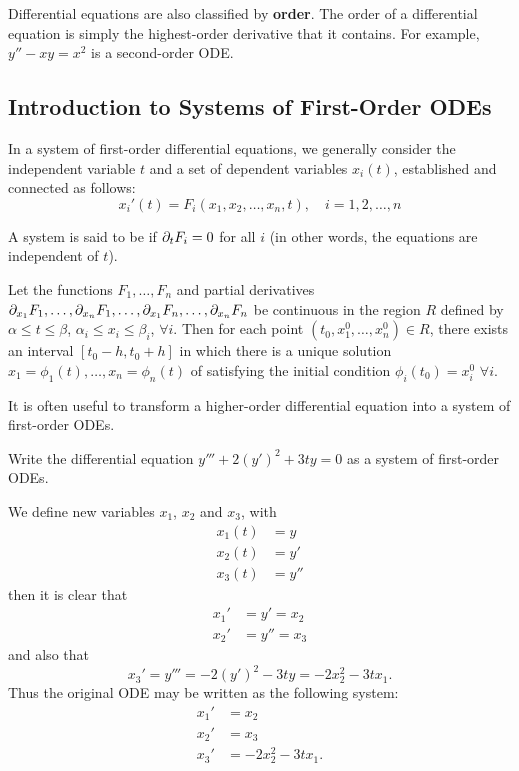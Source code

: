 Differential equations are also classified by \textbf{order}. The order of a differential equation is simply the highest-order derivative that it contains. For example, $y'' - xy = x^2$ is a second-order ODE.


\subsection{Introduction to Systems of First-Order ODEs}

In a system of first-order differential equations, we generally consider the independent variable $t$ and a set of dependent variables $x_i(t)$, established and connected as follows:
\begin{equation}\label{eq:fosystem}
	x_i'(t) = F_i(x_1, x_2, \ldots, x_n, t), \quad i = 1, 2, \ldots, n
\end{equation}

A system is said to be  if $\partial_t F_i = 0$ for all $i$ (in other words, the equations are independent of $t$).

\begin{theorem}
	Let the functions $F_1, \ldots, F_n$ and partial derivatives $\partial_{x_1}F_1, \ldots, \partial_{x_n}F_1, \ldots, \partial_{x_1}F_n, \ldots, \partial_{x_n}F_n$ be continuous in the region $R$ defined by $\alpha \leq t \leq \beta$, $\alpha_i \leq x_i \leq \beta_i$, $\forall i$. Then for each point $(t_0, x_1^0, \ldots, x_n^0) \in R$, there exists an interval $[t_0-h, t_0+h]$ in which there is a unique solution $x_1 = \phi_1(t), \ldots, x_n = \phi_n(t)$ of  satisfying the initial condition $\phi_i(t_0) = x_i^0 \,\, \forall i$.
\end{theorem}

It is often useful to transform a higher-order differential equation into a system of first-order ODEs.

\begin{eg}
	Write the differential equation $y''' + 2(y')^2 + 3ty = 0$ as a system of first-order ODEs.
	
	We define new variables $x_1$, $x_2$ and $x_3$, with
	\begin{align*}
		x_1(t) &= y \\
		x_2(t) &= y' \\
		x_3(t) &= y''
	\end{align*}
	then it is clear that
	\begin{align*}
		x_1' &= y' = x_2 \\
		x_2' &= y'' = x_3
	\end{align*}
	and also that
	\[
	x_3' = y''' = -2(y')^2 - 3ty = -2x_2^2 - 3t x_1. 
	\]
	Thus the original ODE may be written as the following system:
	\begin{align*}
		x_1' &= x_2 \\
		x_2' &= x_3 \\
		x_3' &= -2x_2^2 - 3t x_1.
	\end{align*}
\end{eg}

